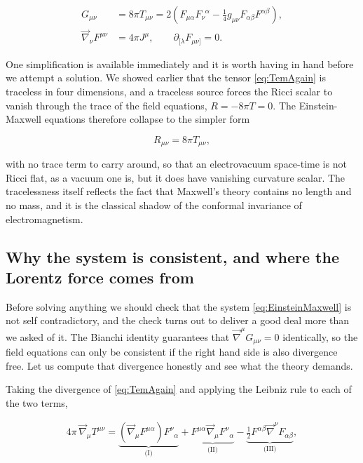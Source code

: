         \begin{align}\label{eq:EinsteinMaxwell}
            G_{\mu\nu} &= 8\pi T_{\mu\nu} = 2\left(F_{\mu\alpha}F_{\nu}^{\;\;\alpha} - \frac{1}{4}g_{\mu\nu}F_{\alpha\beta}F^{\alpha\beta}\right),\\
            \Vec{\nabla}_{\nu}F^{\mu\nu} &= 4\pi J^{\mu}, \qquad \partial_{[\lambda}F_{\mu\nu]} = 0.\nonumber
        \end{align}

        One simplification is available immediately and it is worth having in hand before we attempt a solution. We showed earlier that the tensor \ref{eq:TemAgain} is traceless in four dimensions, and a traceless source forces the Ricci scalar to vanish through the trace of the field equations, $R = -8\pi T = 0$. The Einstein-Maxwell equations therefore collapse to the simpler form

        \begin{equation}\label{eq:EMRicci}
            R_{\mu\nu} = 8\pi T_{\mu\nu},
        \end{equation}

        with no trace term to carry around, so that an electrovacuum space-time is not Ricci flat, as a vacuum one is, but it does have vanishing curvature scalar. The tracelessness itself reflects the fact that Maxwell's theory contains no length and no mass, and it is the classical shadow of the conformal invariance of electromagnetism.

    \subsection{Why the system is consistent, and where the Lorentz force comes from}

        Before solving anything we should check that the system \ref{eq:EinsteinMaxwell} is not self contradictory, and the check turns out to deliver a good deal more than we asked of it. The Bianchi identity guarantees that $\Vec{\nabla}^{\mu}G_{\mu\nu}=0$ identically, so the field equations can only be consistent if the right hand side is also divergence free. Let us compute that divergence honestly and see what the theory demands.

        Taking the divergence of \ref{eq:TemAgain} and applying the Leibniz rule to each of the two terms,

        \begin{align*}
            4\pi\,\Vec{\nabla}_{\mu}T^{\mu\nu} = \underbrace{\left(\Vec{\nabla}_{\mu}F^{\mu\alpha}\right)F^{\nu}_{\;\;\alpha}}_{\text{(I)}} + \underbrace{F^{\mu\alpha}\Vec{\nabla}_{\mu}F^{\nu}_{\;\;\alpha}}_{\text{(II)}} - \underbrace{\frac{1}{2}F^{\alpha\beta}\Vec{\nabla}^{\nu}F_{\alpha\beta}}_{\text{(III)}},
        \end{align*}

